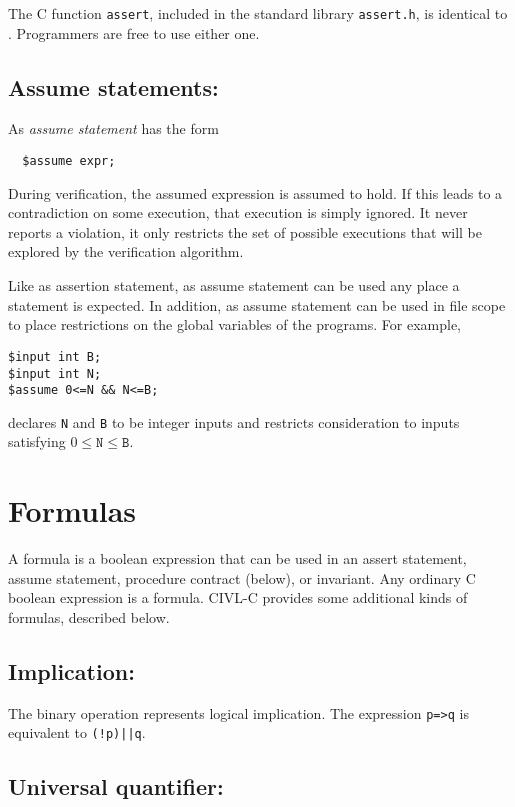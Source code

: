 The C function \texttt{assert}, included in the standard library
\texttt{assert.h}, is identical to \cassert.  Programmers are
free to use either one.


\subsection{Assume statements: \cassume}

As \emph{assume statement} has the form
\begin{verbatim}
  $assume expr;
\end{verbatim}
During verification, the assumed expression is assumed to hold.  If
this leads to a contradiction on some execution, that execution is
simply ignored.  It never reports a violation, it only restricts the
set of possible executions that will be explored by the verification
algorithm.

Like as assertion statement, as assume statement can be used any place
a statement is expected.  In addition, as assume statement can be used
in file scope to place restrictions on the global variables of the
programs.  For example,
\begin{verbatim}
$input int B;
$input int N;
$assume 0<=N && N<=B;
\end{verbatim}
declares \texttt{N} and \texttt{B} to be integer inputs and restricts
consideration to inputs satisfying $0\leq\texttt{N}\leq\texttt{B}$.


\section{Formulas}

A formula is a boolean expression that can be used in an assert
statement, assume statement, procedure contract (below), or invariant.
Any ordinary C boolean expression is a formula. CIVL-C provides some
additional kinds of formulas, described below.

\subsection{Implication: \cimplies}

The binary operation \cimplies{} represents logical implication.
The expression \verb!p=>q! is equivalent to \verb~(!p)||q~.

\subsection{Universal quantifier: \cforall}


